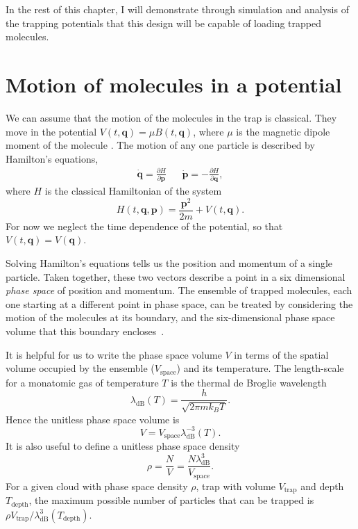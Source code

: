 In the rest of this chapter, I will demonstrate through simulation and analysis
of the trapping potentials that this design will be capable of loading trapped
\CaF{} molecules.

\section{Motion of molecules in a potential}
\label{design:motion}

We can assume that the motion of the molecules in the trap is classical. They
move in the potential $V(t, \mathbf{q}) = \mu B(t, \mathbf{q})$, where $\mu$ is
the magnetic dipole moment of the molecule .  The motion of any one particle is
described by Hamilton's equations,~\cite{Lichtenberg1969}
%
\begin{align}
  \label{design:eq:hamilton}
  \dot{\mathbf{q}} =  \frac{\partial H}{\partial \mathbf{p}} &&
  \dot{\mathbf{p}} = -\frac{\partial H}{\partial \mathbf{q}},
\end{align}
%
where $H$ is the classical Hamiltonian of the system
\begin{equation}
  H(t, \mathbf{q}, \mathbf{p}) = \frac{\mathbf{p}^2}{2m} + V(t, \mathbf{q}).
\end{equation}
For now we neglect the time dependence of the potential, so that $V(t,
\mathbf{q}) = V(\mathbf{q})$.

Solving Hamilton's equations tells us the position and momentum of a single
particle. Taken together, these two vectors describe a point in a six
dimensional \emph{phase space} of position and momentum. The ensemble of
trapped molecules, each one starting at a different point in phase space, can
be treated by considering the motion of the molecules at its
boundary, and the six-dimensional phase space volume that this
boundary encloses~\cite{Hand1998}.

It is helpful for us to write the phase space volume $V$ in terms of the
spatial volume occupied by the ensemble ($V_\text{space}$) and its temperature.
The length-scale for a monatomic gas of temperature $T$ is the thermal de
Broglie wavelength~\cite{blundell2}
%
\begin{equation}
  \lambda_\text{dB}(T) = \frac{h}{\sqrt{2 \pi m k_B T}}.
\end{equation}
%
Hence the unitless phase space volume is
%
\begin{equation}
  V = V_\text{space} \lambda_\text{dB}^{-3}(T).
\end{equation}
%
It is also useful to define a unitless phase space
density~\cite{PhysRevA.52.1423}
%
\begin{equation}
  \rho = \frac{N}{V} = \frac{N \lambda_\text{dB}^3}{V_\text{space}}.
\end{equation}
%
For a given cloud with phase space density $\rho$, trap with volume
$V_\text{trap}$ and depth $T_\text{depth}$,
the maximum possible number of particles that can be trapped is $\rho
V_\text{trap}/\lambda_\text{dB}^3(T_\text{depth})$.

